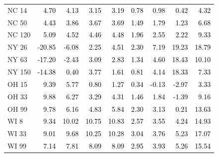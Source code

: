 \documentclass{article}
\begin{document}
\begin{tabular}{lrrrrrrrr}
NC 14 & \textcolor{black}{ 4.70 } & \textcolor{black}{ 4.13 } & \textcolor{black}{ 3.15 } & \textcolor{black}{ 3.19 } & \textcolor{black}{ 0.78 } & \textcolor{black}{ 0.98 } & \textcolor{black}{ 0.42 } & \textcolor{black}{ 4.32 } \\
NC 50 & \textcolor{black}{ 4.43 } & \textcolor{black}{ 3.86 } & \textcolor{black}{ 3.67 } & \textcolor{black}{ 3.69 } & \textcolor{black}{ 1.49 } & \textcolor{black}{ 1.79 } & \textcolor{black}{ 1.23 } & \textcolor{black}{ 6.68 } \\
NC 120 & \textcolor{black}{ 5.09 } & \textcolor{black}{ 4.52 } & \textcolor{black}{ 4.46 } & \textcolor{black}{ 4.48 } & \textcolor{black}{ 1.96 } & \textcolor{black}{ 2.55 } & \textcolor{black}{ 2.22 } & \textcolor{black}{ 9.33 } \\
NY 26 & \textcolor{black}{ -20.85 } & \textcolor{black}{ -6.08 } & \textcolor{black}{ 2.25 } & \textcolor{black}{ 4.51 } & \textcolor{black}{ 2.30 } & \textcolor{black}{ 7.19 } & \textcolor{black}{ 19.23 } & \textcolor{black}{ 18.79 } \\
NY 63 & \textcolor{black}{ -17.20 } & \textcolor{black}{ -2.43 } & \textcolor{black}{ 3.09 } & \textcolor{black}{ 2.83 } & \textcolor{black}{ 1.34 } & \textcolor{black}{ 4.60 } & \textcolor{black}{ 18.43 } & \textcolor{black}{ 10.10 } \\
NY 150 & \textcolor{black}{ -14.38 } & \textcolor{black}{ 0.40 } & \textcolor{black}{ 3.77 } & \textcolor{black}{ 1.61 } & \textcolor{black}{ 0.81 } & \textcolor{black}{ 4.14 } & \textcolor{black}{ 18.33 } & \textcolor{black}{ 7.33 } \\
OH 15 & \textcolor{black}{ 9.39 } & \textcolor{black}{ 5.77 } & \textcolor{black}{ 0.80 } & \textcolor{black}{ 1.27 } & \textcolor{black}{ 0.34 } & \textcolor{black}{ -0.13 } & \textcolor{black}{ -2.97 } & \textcolor{black}{ 3.33 } \\
OH 33 & \textcolor{black}{ 9.88 } & \textcolor{black}{ 6.27 } & \textcolor{black}{ 3.29 } & \textcolor{black}{ 4.31 } & \textcolor{black}{ 1.46 } & \textcolor{black}{ 1.84 } & \textcolor{black}{ -1.39 } & \textcolor{black}{ 9.16 } \\
OH 99 & \textcolor{black}{ 9.78 } & \textcolor{black}{ 6.16 } & \textcolor{black}{ 4.83 } & \textcolor{black}{ 5.84 } & \textcolor{black}{ 2.30 } & \textcolor{black}{ 3.13 } & \textcolor{black}{ 0.21 } & \textcolor{black}{ 13.63 } \\
WI 8 & \textcolor{black}{ 9.34 } & \textcolor{black}{ 10.02 } & \textcolor{black}{ 10.75 } & \textcolor{black}{ 10.83 } & \textcolor{black}{ 2.57 } & \textcolor{black}{ 3.55 } & \textcolor{black}{ 4.24 } & \textcolor{black}{ 14.93 } \\
WI 33 & \textcolor{black}{ 9.01 } & \textcolor{black}{ 9.68 } & \textcolor{black}{ 10.25 } & \textcolor{black}{ 10.28 } & \textcolor{black}{ 3.04 } & \textcolor{black}{ 3.76 } & \textcolor{black}{ 5.23 } & \textcolor{black}{ 17.07 } \\
WI 99 & \textcolor{black}{ 7.14 } & \textcolor{black}{ 7.81 } & \textcolor{black}{ 8.09 } & \textcolor{black}{ 8.09 } & \textcolor{black}{ 2.95 } & \textcolor{black}{ 3.93 } & \textcolor{black}{ 5.26 } & \textcolor{black}{ 15.54 } \\
\bottomrule
\end{tabular}
\end{document}
